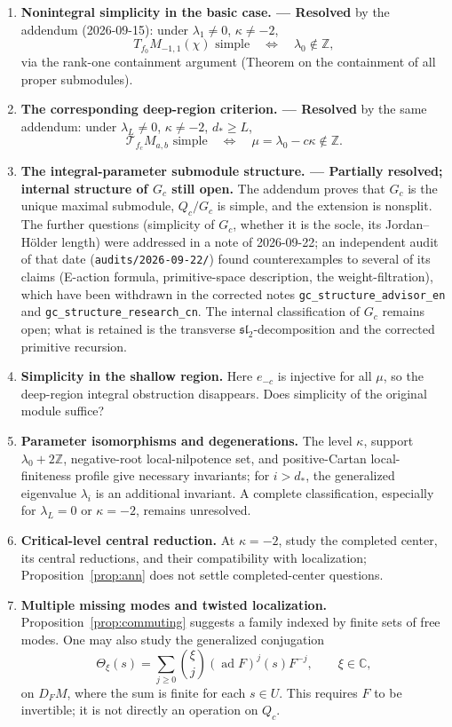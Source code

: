 \documentclass[11pt,a4paper]{article}
\newcommand{\C}{\mathbb C}
\newcommand{\Z}{\mathbb Z}
\newcommand{\ad}{\operatorname{ad}}
\theoremstyle{plainupright}
\begin{document}
\begin{enumerate}[leftmargin=*,label=\arabic*.]
\item \textbf{Nonintegral simplicity in the basic case. --- Resolved}
by the addendum (2026-09-15): under \(\lambda_1\ne0\), \(\kappa\ne-2\),
\[
T_{f_0}M_{-1,1}(\chi)\text{ simple}
\quad\Longleftrightarrow\quad \lambda_0\notin\Z,
\]
via the rank-one containment argument (Theorem on the containment of all
proper submodules).
\item \textbf{The corresponding deep-region criterion. --- Resolved}
by the same addendum: under \(\lambda_L\ne0\), \(\kappa\ne-2\),
\(d_*\ge L\),
\[
\mathcal T_{f_c}M_{a,b}\text{ simple}
\quad\Longleftrightarrow\quad \mu=\lambda_0-c\kappa\notin\Z.
\]
\item \textbf{The integral-parameter submodule structure. --- Partially
resolved; internal structure of \(G_c\) still open.}
The addendum proves that \(G_c\) is the unique maximal submodule,
\(Q_c/G_c\) is simple, and the extension is nonsplit. The further
questions (simplicity of \(G_c\), whether it is the socle, its Jordan--
H\"older length) were addressed in a note of 2026-09-22; an independent
audit of that date (\texttt{audits/2026-09-22/}) found counterexamples to
several of its claims (E-action formula, primitive-space description, the
weight-filtration), which have been withdrawn in the corrected notes
\texttt{gc\_structure\_advisor\_en} and \texttt{gc\_structure\_research\_cn}.
The internal classification of \(G_c\) remains open; what is retained is
the transverse \(\mathfrak{sl}_2\)-decomposition and the corrected
primitive recursion.
\item \textbf{Simplicity in the shallow region.}
Here \(e_{-c}\) is injective for all \(\mu\), so the deep-region integral
obstruction disappears. Does simplicity of the original module suffice?
\item \textbf{Parameter isomorphisms and degenerations.}
The level \(\kappa\), support \(\lambda_0+2\Z\), negative-root
local-nilpotence set, and positive-Cartan local-finiteness profile give
necessary invariants; for \(i>d_*\), the generalized eigenvalue \(\lambda_i\)
is an additional invariant. A complete classification, especially for
\(\lambda_L=0\) or \(\kappa=-2\), remains unresolved.
\item \textbf{Critical-level central reduction.}
At \(\kappa=-2\), study the completed center, its central reductions, and
their compatibility with localization; Proposition~\ref{prop:ann} does not
settle completed-center questions.
\item \textbf{Multiple missing modes and twisted localization.}
Proposition~\ref{prop:commuting} suggests a family indexed by finite sets of
free modes. One may also study the generalized conjugation
\[
\Theta_\xi(s)=\sum_{j\ge0}\binom{\xi}{j}(\ad F)^j(s)F^{-j},\qquad \xi\in\C,
\]
on \(D_FM\), where the sum is finite for each \(s\in U\). This requires \(F\)
to be invertible; it is not directly an operation on \(Q_c\).
\end{enumerate}
\end{document}
